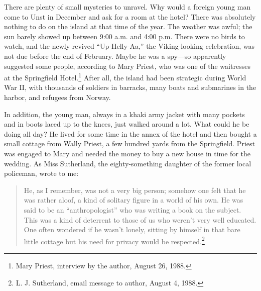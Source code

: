 \documentclass[twoside,symmetric,nobib,justified]{tufte-book}
\begin{document}
There are plenty of small mysteries to unravel. Why would a foreign
young man come to Unst in December and ask for a room at the hotel?
There was absolutely nothing to do on the island at that time of the
year. The weather was awful; the sun barely showed up between 9:00 a.m.
and 4:00 p.m. There were no birds to watch, and the newly revived
``Up-Helly-Aa,'' the Viking-looking celebration, was not due before the
end of February. Maybe he was a spy---so apparently suggested some
people, according to Mary Priest, who was one of the waitresses at the
Springfield Hotel.\footnote{Mary Priest, interview by the author, August
  26, 1988.} After all, the island had been strategic during World War
II, with thousands of soldiers in barracks, many boats and submarines in
the harbor, and refugees from Norway.

In addition, the young man, always in a khaki army jacket with many
pockets and in boots laced up to the knees, just walked around a lot.
What could he be doing all day? He lived for some time in the annex of
the hotel and then bought a small cottage from Wally Priest, a few
hundred yards from the Springfield. Priest was engaged to Mary and
needed the money to buy a new house in time for the wedding. As Miss
Sutherland, the eighty-something daughter of the former local policeman,
wrote to me:

\begin{quote}
He, as I remember, was not a very big person; somehow one felt that he
was rather aloof, a kind of solitary figure in a world of his own. He
was said to be an ``anthropologist'' who was writing a book on the
subject. This was a kind of deterrent to those of us who weren't very
well educated. One often wondered if he wasn't lonely, sitting by
himself in that bare little cottage but his need for privacy would be
respected.\footnote{L. J. Sutherland, email message to author, August 4,
  1988.}
\end{quote}
\end{document}

